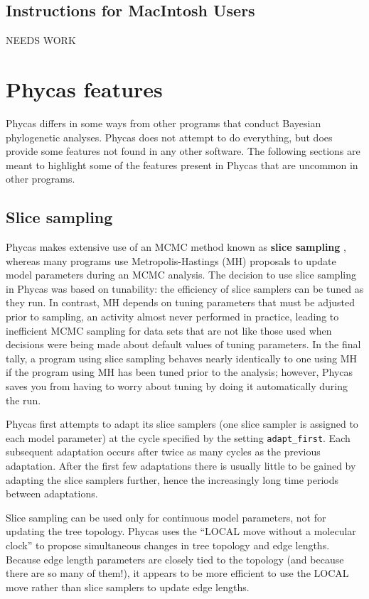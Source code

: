 \documentclass[10pt]{article}
\newcommand{\term}[1]{{\bfseries #1}\index{#1}}
\newcommand{\setting}[1]{{\tt \small #1}\index{#1}}
\begin{document}
\subsection{Instructions for MacIntosh Users}

NEEDS WORK

\section{Phycas features}

Phycas differs in some ways from other programs that conduct Bayesian phylogenetic analyses. Phycas does not attempt to do everything, but does provide some features not found in any other software. The following sections are meant to highlight some of the features present in Phycas that are uncommon in other programs.

\subsection{Slice sampling}

Phycas makes extensive use of an MCMC method known as \term{slice sampling} \citep{Neal2003a}, whereas many programs use Metropolis-Hastings (MH) proposals to update model parameters during an MCMC analysis. The decision to use slice sampling in Phycas was based on tunability: the efficiency of slice samplers can be tuned as they run. In contrast, MH depends on tuning parameters that must be adjusted prior to sampling, an activity almost never performed in practice, leading to inefficient MCMC sampling for data sets that are not like those used when decisions were being made about default values of tuning parameters. In the final tally, a program using slice sampling behaves nearly identically to one using MH if the program using MH has been tuned prior to the analysis; however, Phycas saves you from having to worry about tuning by doing it automatically during the run. 

Phycas first attempts to adapt its slice samplers (one slice sampler is assigned to each model parameter) at the cycle specified by the setting \setting{adapt\_first}. Each subsequent adaptation occurs after twice as many cycles as the previous adaptation. After the first few adaptations there is usually little to be gained by adapting the slice samplers further, hence the increasingly long time periods between adaptations. 

Slice sampling can be used only for continuous model parameters, not for updating the tree topology. Phycas uses the \citet{LargetSimon1999} ``LOCAL move without a molecular clock'' to propose simultaneous changes in tree topology and edge lengths. Because edge length parameters are closely tied to the topology (and because there are so many of them!), it appears to be more efficient to use the LOCAL move rather than slice samplers to update edge lengths.
\end{document}
